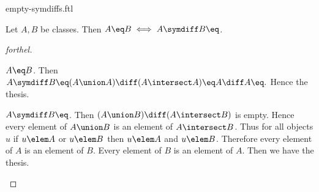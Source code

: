 \documentclass{naproche-library}
\begin{document}
\begin{smodule}[title=Empty Symmetric Differences]{empty-symdiffs.ftl}


\begin{proposition}[forthel,id=EmptySymdiffProp]
  Let $A, B$ be classes.
  Then $A \eq B \iff A \symdiff B \eq \empty$.
\end{proposition}
\begin{proof}[forthel]
  \begin{case}{$A \eq B$.}
    Then $A \symdiff B
      \eq (A \union A) \diff (A \intersect A)
      \eq A \diff A
      \eq \empty.$
    Hence the thesis.
  \end{case}

  \begin{case}{$A \symdiff B \eq \empty$.}
    Then $(A \union B) \diff (A \intersect B)$ is empty.
    Hence every element of $A \union B$ is an element of $A \intersect B$.
    Thus for all objects $u$ if $u \elem A$ or $u \elem B$ then $u \elem A$ and $u \elem B$.
    Therefore every element of $A$ is an element of $B$.
    Every element of $B$ is an element of $A$.
    Then we have the thesis.
  \end{case}
\end{proof}

\end{smodule}
\end{document}
